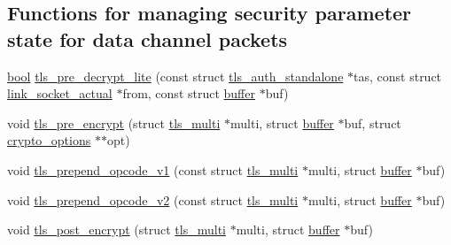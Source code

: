 \subsection*{Functions for managing security parameter state for data channel packets}
\begin{DoxyCompactItemize}
\item 
\hyperlink{automatic_8c_abb452686968e48b67397da5f97445f5b}{bool} \hyperlink{group__data__crypto_gab1369f42e94bbec108d952d565b0f283}{tls\+\_\+pre\+\_\+decrypt\+\_\+lite} (const struct \hyperlink{structtls__auth__standalone}{tls\+\_\+auth\+\_\+standalone} $\ast$tas, const struct \hyperlink{structlink__socket__actual}{link\+\_\+socket\+\_\+actual} $\ast$from, const struct \hyperlink{structbuffer}{buffer} $\ast$buf)
\item 
void \hyperlink{group__data__crypto_gaba03eaba587a89c2abda8780da7b3ac7}{tls\+\_\+pre\+\_\+encrypt} (struct \hyperlink{structtls__multi}{tls\+\_\+multi} $\ast$multi, struct \hyperlink{structbuffer}{buffer} $\ast$buf, struct \hyperlink{structcrypto__options}{crypto\+\_\+options} $\ast$$\ast$opt)
\item 
void \hyperlink{group__data__crypto_gaac2b3aa2c842a102804be65f28adf4b1}{tls\+\_\+prepend\+\_\+opcode\+\_\+v1} (const struct \hyperlink{structtls__multi}{tls\+\_\+multi} $\ast$multi, struct \hyperlink{structbuffer}{buffer} $\ast$buf)
\item 
void \hyperlink{group__data__crypto_gad27b20736f89d38d0d2e0c2e35f7a0e3}{tls\+\_\+prepend\+\_\+opcode\+\_\+v2} (const struct \hyperlink{structtls__multi}{tls\+\_\+multi} $\ast$multi, struct \hyperlink{structbuffer}{buffer} $\ast$buf)
\item 
void \hyperlink{group__data__crypto_ga1f2ecd39b88da77b2f8067962155ea82}{tls\+\_\+post\+\_\+encrypt} (struct \hyperlink{structtls__multi}{tls\+\_\+multi} $\ast$multi, struct \hyperlink{structbuffer}{buffer} $\ast$buf)
\end{DoxyCompactItemize}


